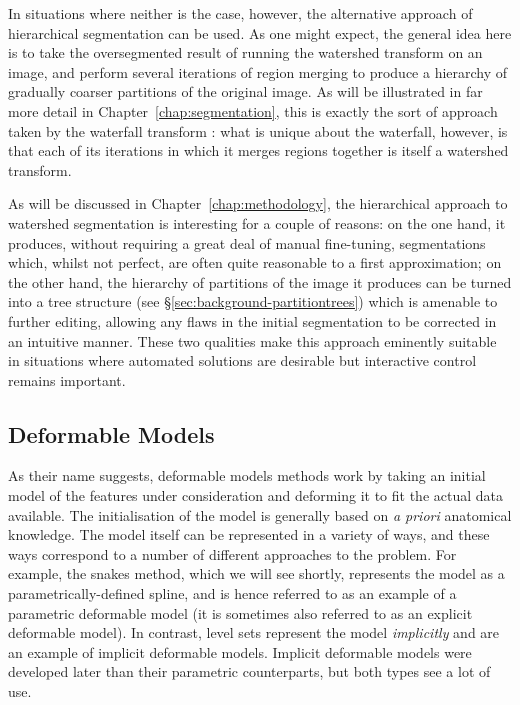 In situations where neither is the case, however, the alternative approach of hierarchical segmentation can be used. As one might expect, the general idea here is to take the oversegmented result of running the watershed transform on an image, and perform several iterations of region merging to produce a hierarchy of gradually coarser partitions of the original image. As will be illustrated in far more detail in Chapter~\ref{chap:segmentation}, this is exactly the sort of approach taken by the waterfall transform \cite{beucher90,marcotegui05}: what is unique about the waterfall, however, is that each of its iterations in which it merges regions together is itself a watershed transform.

As will be discussed in Chapter~\ref{chap:methodology}, the hierarchical approach to watershed segmentation is interesting for a couple of reasons: on the one hand, it produces, without requiring a great deal of manual fine-tuning, segmentations which, whilst not perfect, are often quite reasonable to a first approximation; on the other hand, the hierarchy of partitions of the image it produces can be turned into a tree structure (see \S\ref{sec:background-partitiontrees}) which is amenable to further editing, allowing any flaws in the initial segmentation to be corrected in an intuitive manner. These two qualities make this approach eminently suitable in situations where automated solutions are desirable but interactive control remains important.

\subsection{Deformable Models}

As their name suggests, deformable models methods work by taking an initial model of the features under consideration and deforming it to fit the actual data available. The initialisation of the model is generally based on \emph{a priori} anatomical knowledge. The model itself can be represented in a variety of ways, and these ways correspond to a number of different approaches to the problem. For example, the snakes method, which we will see shortly, represents the model as a parametrically-defined spline, and is hence referred to as an example of a parametric deformable model (it is sometimes also referred to as an explicit deformable model). In contrast, level sets represent the model \emph{implicitly} and are an example of implicit deformable models. Implicit deformable models were developed later than their parametric counterparts, but both types see a lot of use.

